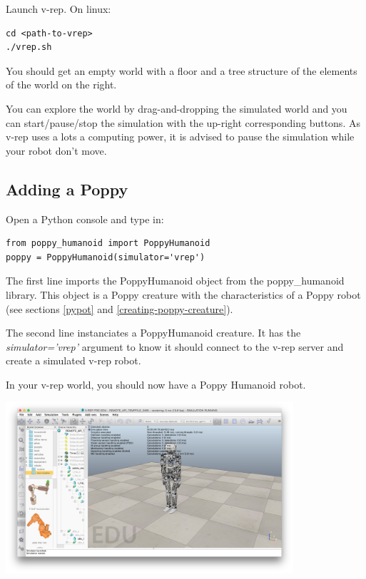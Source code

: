 \documentclass{article}
\begin{document}
Launch v-rep. On linux:

\begin{verbatim}
cd <path-to-vrep>
./vrep.sh
\end{verbatim}

You should get an empty world with a floor and a tree structure of the elements of the world on the right.

You can explore the world by drag-and-dropping the simulated world and you can start/pause/stop the simulation with the up-right corresponding buttons. As v-rep uses a lots a computing power, it is advised to pause the simulation while your robot don't move.

\subsection{Adding a Poppy}

Open a Python console and type in:

\begin{verbatim}
from poppy_humanoid import PoppyHumanoid
poppy = PoppyHumanoid(simulator='vrep')
\end{verbatim}

The first line imports the PoppyHumanoid object from the poppy\_humanoid library. This object is a Poppy creature with the characteristics of a Poppy robot (see sections \ref{pypot} and \ref{creating-poppy-creature}).

The second line instanciates a PoppyHumanoid creature. It has the \textit{simulator='vrep'} argument to know it should connect to the v-rep server and create a simulated v-rep robot.

In your v-rep world, you should now have a Poppy Humanoid robot.

 \begin{center}
  \includegraphics[width=0.8\textwidth]{img/vrep-poppy}
 \end{center}
   
\end{document}
